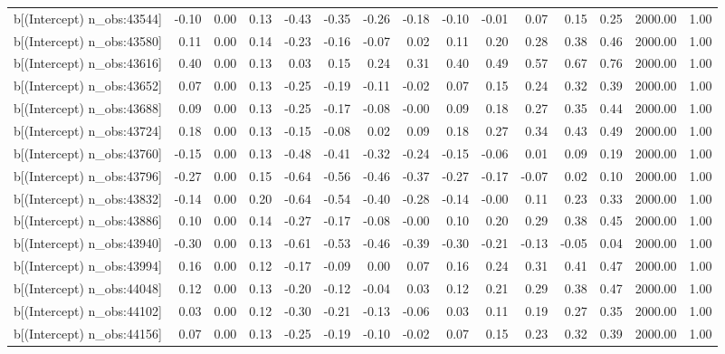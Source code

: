 \begin{table}[ht]
\begin{tabular}{rrrrrrrrrrrrrrr}
  b[(Intercept) n\_obs:43544] & -0.10 & 0.00 & 0.13 & -0.43 & -0.35 & -0.26 & -0.18 & -0.10 & -0.01 & 0.07 & 0.15 & 0.25 & 2000.00 & 1.00 \\ 
  b[(Intercept) n\_obs:43580] & 0.11 & 0.00 & 0.14 & -0.23 & -0.16 & -0.07 & 0.02 & 0.11 & 0.20 & 0.28 & 0.38 & 0.46 & 2000.00 & 1.00 \\ 
  b[(Intercept) n\_obs:43616] & 0.40 & 0.00 & 0.13 & 0.03 & 0.15 & 0.24 & 0.31 & 0.40 & 0.49 & 0.57 & 0.67 & 0.76 & 2000.00 & 1.00 \\ 
  b[(Intercept) n\_obs:43652] & 0.07 & 0.00 & 0.13 & -0.25 & -0.19 & -0.11 & -0.02 & 0.07 & 0.15 & 0.24 & 0.32 & 0.39 & 2000.00 & 1.00 \\ 
  b[(Intercept) n\_obs:43688] & 0.09 & 0.00 & 0.13 & -0.25 & -0.17 & -0.08 & -0.00 & 0.09 & 0.18 & 0.27 & 0.35 & 0.44 & 2000.00 & 1.00 \\ 
  b[(Intercept) n\_obs:43724] & 0.18 & 0.00 & 0.13 & -0.15 & -0.08 & 0.02 & 0.09 & 0.18 & 0.27 & 0.34 & 0.43 & 0.49 & 2000.00 & 1.00 \\ 
  b[(Intercept) n\_obs:43760] & -0.15 & 0.00 & 0.13 & -0.48 & -0.41 & -0.32 & -0.24 & -0.15 & -0.06 & 0.01 & 0.09 & 0.19 & 2000.00 & 1.00 \\ 
  b[(Intercept) n\_obs:43796] & -0.27 & 0.00 & 0.15 & -0.64 & -0.56 & -0.46 & -0.37 & -0.27 & -0.17 & -0.07 & 0.02 & 0.10 & 2000.00 & 1.00 \\ 
  b[(Intercept) n\_obs:43832] & -0.14 & 0.00 & 0.20 & -0.64 & -0.54 & -0.40 & -0.28 & -0.14 & -0.00 & 0.11 & 0.23 & 0.33 & 2000.00 & 1.00 \\ 
  b[(Intercept) n\_obs:43886] & 0.10 & 0.00 & 0.14 & -0.27 & -0.17 & -0.08 & -0.00 & 0.10 & 0.20 & 0.29 & 0.38 & 0.45 & 2000.00 & 1.00 \\ 
  b[(Intercept) n\_obs:43940] & -0.30 & 0.00 & 0.13 & -0.61 & -0.53 & -0.46 & -0.39 & -0.30 & -0.21 & -0.13 & -0.05 & 0.04 & 2000.00 & 1.00 \\ 
  b[(Intercept) n\_obs:43994] & 0.16 & 0.00 & 0.12 & -0.17 & -0.09 & 0.00 & 0.07 & 0.16 & 0.24 & 0.31 & 0.41 & 0.47 & 2000.00 & 1.00 \\ 
  b[(Intercept) n\_obs:44048] & 0.12 & 0.00 & 0.13 & -0.20 & -0.12 & -0.04 & 0.03 & 0.12 & 0.21 & 0.29 & 0.38 & 0.47 & 2000.00 & 1.00 \\ 
  b[(Intercept) n\_obs:44102] & 0.03 & 0.00 & 0.12 & -0.30 & -0.21 & -0.13 & -0.06 & 0.03 & 0.11 & 0.19 & 0.27 & 0.35 & 2000.00 & 1.00 \\ 
  b[(Intercept) n\_obs:44156] & 0.07 & 0.00 & 0.13 & -0.25 & -0.19 & -0.10 & -0.02 & 0.07 & 0.15 & 0.23 & 0.32 & 0.39 & 2000.00 & 1.00 \\ 

\end{tabular}
\end{table}
